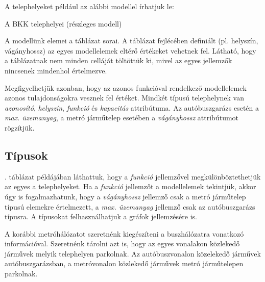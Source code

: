 A telephelyeket például az alábbi modellel írhatjuk le:

\begin{table}[H]
	\centering
	
	\caption{A BKK telephelyei (részleges modell)}
	\label{tab:jarmutelepek}
\end{table}

A modellünk elemei a táblázat sorai. A táblázat fejlécében definiált  (pl. helyszín, vágányhossz) az egyes modellelemek eltérő értékeket vehetnek fel. Látható, hogy a táblázatnak nem minden celláját töltöttük ki, mivel az egyes jellemzők nincsenek mindenhol értelmezve.

Megfigyelhetjük azonban, hogy az azonos %
funkcióval rendelkező modellelemek azonos tulajdonságokra vesznek fel értéket.
Mindkét típusú telephelynek van \textit{azonosító}, \textit{helyszín}, \textit{funkció} és \textit{kapacitás} attribútuma. Az \textsf{autóbuszgarázs} esetén a \textit{max. üzemanyag}, a \textsf{metró járműtelep} esetében a \textit{vágányhossz} attribútumot rögzítjük.

\subsection{Típusok}

. táblázat példájában láthattuk, hogy a \textit{funkció} jellemzővel megkülönböztethetjük az egyes a telephelyeket. Ha a \textit{funkció} jellemzőt a modellelemek  tekintjük, akkor úgy is fogalmazhatunk, hogy a \textit{vágányhossz} jellemző csak a \textsf{metró járműtelep} típusú elemekre értelmezett, a \textit{max. üzemanyag} jellemző csak az \textsf{autóbuszgarázs} típusra. A típusokat felhasználhatjuk a gráfok jellemzésére is.

\begin{pelda}
	A korábbi metróhálózatot szeretnénk kiegészíteni a buszhálózatra vonatkozó információval. Szeretnénk tárolni azt is, hogy az egyes vonalakon közlekedő járművek melyik telephelyen parkolnak. Az autóbuszvonalon közelekedő járművek autóbuszgarázsban, a metróvonalon közlekedő járművek metró járműtelepen parkolnak.
\end{pelda}

